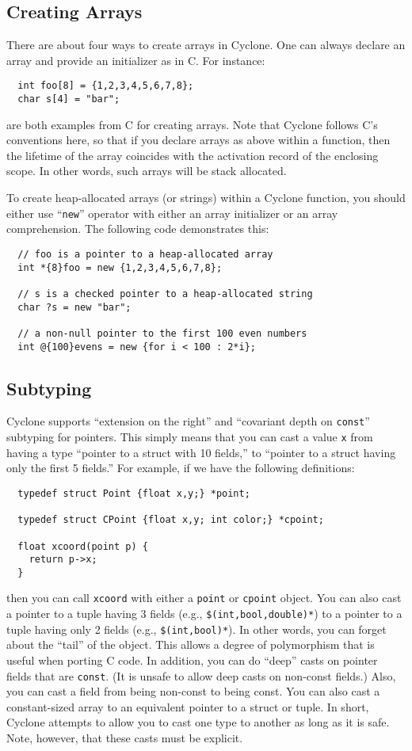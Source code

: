 \subsection{Creating Arrays}

There are about four ways to create arrays in Cyclone. One can always
declare an array and provide an initializer as in C\@. For instance:
\begin{verbatim}
  int foo[8] = {1,2,3,4,5,6,7,8};
  char s[4] = "bar";
\end{verbatim}
are both examples from C for creating arrays.  Note that Cyclone
follows C's conventions here, so that if you declare arrays as above
within a function, then the lifetime of the array coincides with the
activation record of the enclosing scope.  In other words, such arrays
will be stack allocated.

To create heap-allocated arrays (or strings) within a Cyclone
function, you should either use ``\texttt{new}'' operator with either an
array initializer or an array comprehension. The following code
demonstrates this:
\begin{verbatim}
  // foo is a pointer to a heap-allocated array
  int *{8}foo = new {1,2,3,4,5,6,7,8};

  // s is a checked pointer to a heap-allocated string
  char ?s = new "bar";

  // a non-null pointer to the first 100 even numbers
  int @{100}evens = new {for i < 100 : 2*i};
\end{verbatim}

\subsection{Subtyping}
Cyclone supports ``extension on the right'' and ``covariant depth on
\texttt{const}'' subtyping for pointers.  This simply means that you
can cast a value \texttt{x} from having a type ``pointer to a struct
with 10 fields,'' to ``pointer to a struct having only the first 5
fields.''  For example, if we have the following definitions:
\begin{verbatim}
  typedef struct Point {float x,y;} *point;

  typedef struct CPoint {float x,y; int color;} *cpoint;

  float xcoord(point p) {
    return p->x;
  }
\end{verbatim}
then you can call \texttt{xcoord} with either a \texttt{point} or
\texttt{cpoint} object.  You can also cast a pointer to a tuple having 3
fields (e.g., \texttt{\$(int,bool,double)*}) to a pointer to a tuple
having only 2 fields (e.g., \texttt{\$(int,bool)*}).  In other words, you
can forget about the ``tail'' of the object.  This allows a degree of
polymorphism that is useful when porting C code.  In addition, you can
do ``deep'' casts on pointer fields that are \texttt{const}.  (It is
unsafe to allow deep casts on non-const fields.)  Also, you can cast
a field from being non-const to being const.  You can also cast a
constant-sized array to an equivalent pointer to a struct or tuple.
In short, Cyclone attempts to allow you to cast one type to another as
long as it is safe.  Note, however, that these casts must be explicit.

